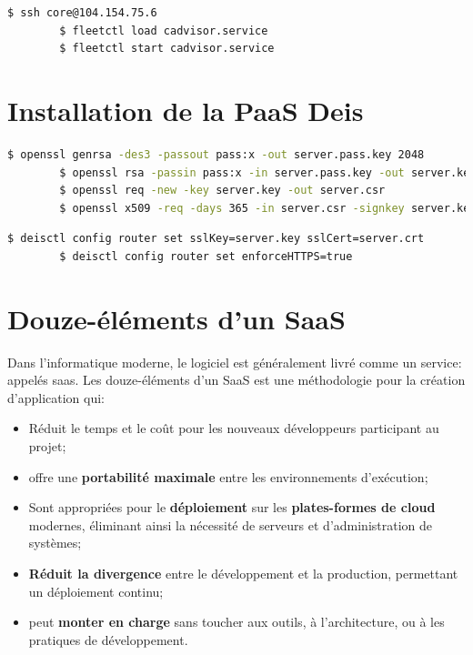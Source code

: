 	\begin{lstlisting}[language=bash,caption=Lancement des services]
		$ ssh core@104.154.75.6 
		$ fleetctl load cadvisor.service
		$ fleetctl start cadvisor.service
	\end{lstlisting}



\chapter{Installation de la PaaS Deis}

	\begin{lstlisting}[language=bash,caption=Génération de la clé privée eet la certificat]
		$ openssl genrsa -des3 -passout pass:x -out server.pass.key 2048
		$ openssl rsa -passin pass:x -in server.pass.key -out server.key
		$ openssl req -new -key server.key -out server.csr
		$ openssl x509 -req -days 365 -in server.csr -signkey server.key -out server.crt
	\end{lstlisting}

	\begin{lstlisting}[language=bash,caption=Activation du protocole SSL]
		$ deisctl config router set sslKey=server.key sslCert=server.crt
		$ deisctl config router set enforceHTTPS=true
	\end{lstlisting}	

\chapter{Douze-éléments d'un SaaS}
\label{annexe:12factors}

Dans l'informatique moderne, le logiciel est généralement livré comme un service: appelés \acrshort{saas}. Les douze-éléments d'un SaaS est une méthodologie pour la création d'application qui:

\begin{itemize}
	\item Réduit le temps et le coût pour les nouveaux développeurs participant au projet;
	\item offre une \textbf{portabilité maximale} entre les environnements d'exécution;
	\item Sont appropriées pour le \textbf{déploiement} sur les \textbf{plates-formes de cloud} modernes, éliminant ainsi la nécessité de serveurs et d'administration de systèmes;
	\item \textbf{Réduit la divergence} entre le développement et la production, permettant un déploiement continu;
	\item peut \textbf{monter en charge} sans toucher aux outils, à l'architecture, ou à les pratiques de développement.
\end{itemize}


